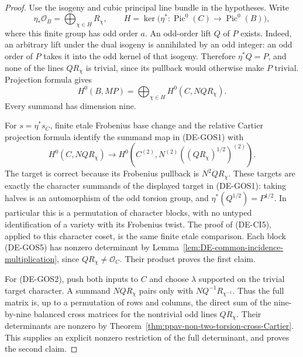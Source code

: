 \begin{proof}
Use the isogeny and cubic principal line bundle in the hypotheses.
Write
\[
 \eta_*\mathcal O_B=\bigoplus_{\chi\in H}R_\chi,
 \qquad H=\ker\bigl(\eta^*: \operatorname{Pic}^0(C)
                               \to\operatorname{Pic}^0(B)\bigr),
 \tag{DE-GOS3}
\]
where this finite group has odd order \(a\).
An odd-order lift \(Q\) of \(P\) exists. Indeed, an arbitrary lift
under the dual isogeny is annihilated by an odd integer: an odd order
of \(P\) takes it into the odd kernel of that isogeny. Therefore
\(\eta^*Q=P\), and none of the lines \(Q R_\chi\) is trivial,
since its pullback would otherwise make \(P\) trivial.
Projection formula gives
\[
 H^0(B,MP)=\bigoplus_{\chi\in H}H^0(C,NQ R_\chi).
 \tag{DE-GOS4}
\]
Every summand has dimension nine.

For \(s=\eta^*s_C\), finite etale Frobenius base change and the
relative Cartier projection formula identify the summand map in
(DE-GOS1) with
\[
 H^0(C,NQ R_\chi)\longrightarrow
 H^0(C^{(2)},N^{(2)}
                    ((Q R_\chi)^{1/2})^{(2)}).
 \tag{DE-GOS5}
\]
The target is correct because its Frobenius pullback is
\(N^2Q R_\chi\). These targets are exactly the character summands
of the displayed target in (DE-GOS1): taking halves is an automorphism
of the odd torsion group, and
\(\eta^*(Q^{1/2})=P^{1/2}\). In particular this is a permutation
of character blocks, with no untyped identification of a variety
with its Frobenius twist. The proof of (DE-CI5), applied to this
character coset, is the same finite etale comparison.
Each block (DE-GOS5) has nonzero determinant by
Lemma~\ref{lem:DE-common-incidence-multiplication}, since
\(Q R_\chi\ne\mathcal O_C\). Their product proves the first claim.

For (DE-GOS2), push both inputs to \(C\) and choose \(\lambda\)
supported on the trivial target character. A summand
\(NQ R_\chi\) pairs only with \(NQ^{-1}R_{\chi^{-1}}\).
Thus the full matrix is, up to a permutation of rows and columns,
the direct sum of the nine-by-nine balanced cross matrices for
the nontrivial odd lines \(Q R_\chi\). Their determinants are
nonzero by Theorem~\ref{thm:ppav-non-two-torsion-cross-Cartier}.
This supplies an explicit nonzero restriction of the full determinant,
and proves the second claim.


\end{proof}
